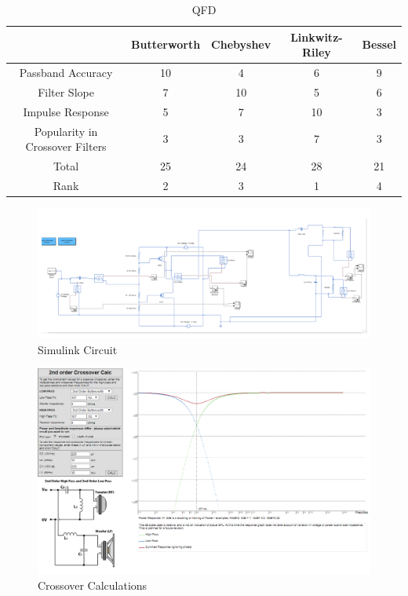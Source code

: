 \documentclass{article}
\begin{document}
\begin{table}[h]
\begin{center}
\begin{tabular}{c|c|c|c|c}
& Butterworth & Chebyshev & Linkwitz-Riley & Bessel\\
\hline
Passband Accuracy & 10 & 4 & 6 & 9\\
\hline
Filter Slope & 7 & 10 & 5 & 6\\
\hline
Impulse Response & 5 & 7 & 10 & 3\\
\hline
Popularity in Crossover Filters & 3 & 3 & 7 & 3\\
\hline
Total & 25 & 24 & 28 & 21\\
\hline
Rank & 2 & 3 & 1 & 4\\
\end{tabular}
\caption{QFD}
\end{center}
\end{table}

\begin{figure}[h]
\begin{center}
\includegraphics[width=\textwidth]{SimulinkCircuit.png}
\caption{Simulink Circuit}
\end{center}
\end{figure}

\begin{figure}[h]
\begin{center}
\includegraphics[width=\textwidth]{Crossover_Math.png}
\caption{Crossover Calculations}
\end{center}
\end{figure}
\end{document}
